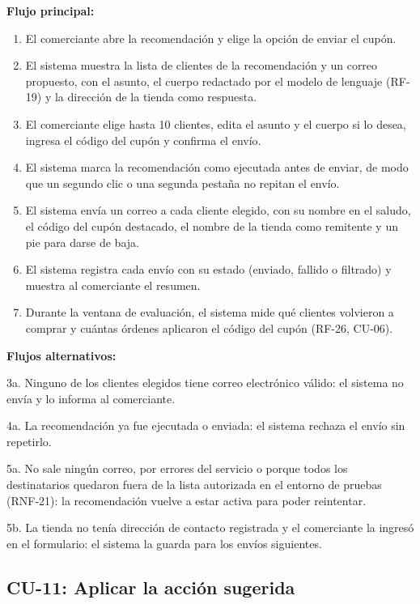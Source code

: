 \noindent\textbf{Flujo principal:}
\begin{enumerate}
    \item El comerciante abre la recomendación y elige la opción de enviar el cupón.
    \item El sistema muestra la lista de clientes de la recomendación y un correo propuesto, con el asunto, el cuerpo redactado por el modelo de lenguaje (RF-19) y la dirección de la tienda como respuesta.
    \item El comerciante elige hasta 10 clientes, edita el asunto y el cuerpo si lo desea, ingresa el código del cupón y confirma el envío.
    \item El sistema marca la recomendación como ejecutada antes de enviar, de modo que un segundo clic o una segunda pestaña no repitan el envío.
    \item El sistema envía un correo a cada cliente elegido, con su nombre en el saludo, el código del cupón destacado, el nombre de la tienda como remitente y un pie para darse de baja.
    \item El sistema registra cada envío con su estado (enviado, fallido o filtrado) y muestra al comerciante el resumen.
    \item Durante la ventana de evaluación, el sistema mide qué clientes volvieron a comprar y cuántas órdenes aplicaron el código del cupón (RF-26, CU-06).
\end{enumerate}

\noindent\textbf{Flujos alternativos:}

\noindent 3a. Ninguno de los clientes elegidos tiene correo electrónico válido: el sistema no envía y lo informa al comerciante.

\noindent 4a. La recomendación ya fue ejecutada o enviada: el sistema rechaza el envío sin repetirlo.

\noindent 5a. No sale ningún correo, por errores del servicio o porque todos los destinatarios quedaron fuera de la lista autorizada en el entorno de pruebas (RNF-21): la recomendación vuelve a estar activa para poder reintentar.

\noindent 5b. La tienda no tenía dirección de contacto registrada y el comerciante la ingresó en el formulario: el sistema la guarda para los envíos siguientes.

\subsection{CU-11: Aplicar la acción sugerida}
\label{sec:cu-11}

